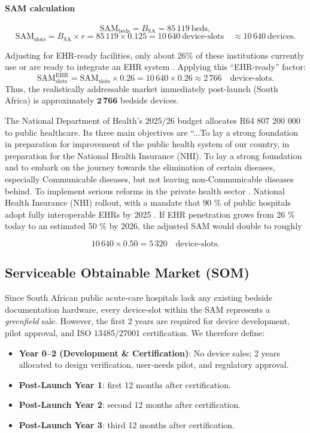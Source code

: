 \documentclass[a4paper,11pt]{article}
\begin{document}
\paragraph{SAM calculation}  
\[
  \mathrm{SAM}_{\mathrm{beds}}
  = B_{\mathrm{SA}}
  = 85\,119\ \text{beds},
\]
\[
  \mathrm{SAM}_{\mathrm{slots}}
  = B_{\mathrm{SA}} \times r
  = 85\,119 \times 0.125
  = 10\,640\ \text{device-slots}
  \quad\approx10\,640\ \text{devices}.
\]

 Adjusting for EHR-ready facilities, only about 26\% of these institutions currently use or are ready to integrate an EHR system \cite{ProgressImplementingUsing2023}. Applying this “EHR-ready” factor:
\[
  \mathrm{SAM}_{\mathrm{slots}}^{\mathrm{EHR}}
  = \mathrm{SAM}_{\mathrm{slots}} \times 0.26
  = 10\,640 \times 0.26
  \approx 2\,766
  \quad\text{device-slots.}
\]
Thus, the realistically addressable market immediately post-launch  (South Africa) is approximately \(\mathbf{2\,766}\) bedside devices.

The National Department of Health’s 2025/26 budget allocates R64 807 200 000 to public healthcare. Its three main objectives are “...To lay a strong foundation in preparation for improvement of the public health system of our country, in preparation for the National Health Insurance (NHI). To lay a strong foundation and to embark on the journey towards the elimination of certain diseases, especially Communicable diseases, but not leaving non-Communicable diseases behind. To implement serious reforms in the private health sector \cite{MinisterAaronMotsoaledi}.  National Health Insurance (NHI) rollout, with a mandate that 90 \% of public hospitals adopt fully interoperable EHRs by 2025 \cite{DoH_NHI_plan}. If EHR penetration grows from 26 \% today to an estimated 50 \% by 2026, the adjusted SAM would double to roughly

\[
  10\,640 \times 0.50 = 5\,320
  \quad\text{device-slots.}
\]


\subsection{Serviceable Obtainable Market (SOM)}

Since South African public acute‐care hospitals lack any existing bedside documentation hardware, every device‐slot within the SAM represents a \emph{greenfield} sale.  However, the first 2 years are required for device development, pilot approval, and ISO 13485/27001 certification.  We therefore define:

\begin{itemize}
  \item \textbf{Year 0–2 (Development \& Certification)}: No device sales; 2 years allocated to design verification, user‐needs pilot, and regulatory approval.
  \item \textbf{Post-Launch Year 1}: first 12 months after certification.
  \item \textbf{Post-Launch Year 2}: second 12 months after certification.
  \item \textbf{Post-Launch Year 3}: third 12 months after certification.
\end{itemize}
\end{document}
